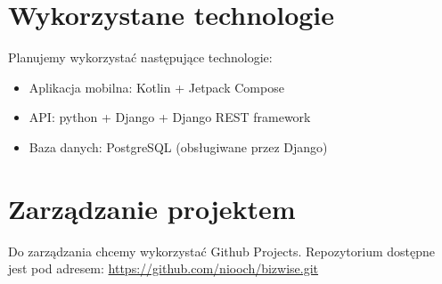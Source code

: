 \documentclass[11pt,a4paper]{article}
\theoremstyle{polski}
\theoremstyle{polski-def}
\numberwithin{equation}{section}
\begin{document}
\section{Wykorzystane technologie}
Planujemy wykorzystać następujące technologie:
\begin{itemize}
    \item Aplikacja mobilna: Kotlin + Jetpack Compose
    \item API: python + Django + Django REST framework
    \item Baza danych: PostgreSQL (obsługiwane przez Django)
\end{itemize}

\section{Zarządzanie projektem}
Do zarządzania chcemy wykorzystać Github Projects. Repozytorium dostępne jest pod adresem: \url{https://github.com/niooch/bizwise.git}
            
\end{document}
